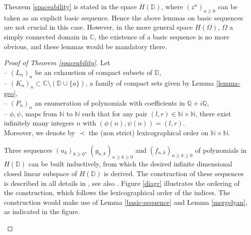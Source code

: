 \documentclass[12pt]{amsart}
\numberwithin{equation}{section}
\begin{document}
Theorem \ref{spaceability} is stated in the space $H({\mathbb D})$, where $(z^{n})_{n\geq 0}$ can be taken as an explicit basic sequence. Hence the above lemmas on basic sequences are not crucial in this case. However, in the more general space $H(\Omega)$, $\Omega$ a simply connected domain in ${\mathbb{C}}$, the existence of a basic sequence is no more obvious, and these lemmas would be mandatory there.
\begin{proof}[Proof of Theorem \ref{spaceability}]Let \\
-- $\left(L_n\right)_n$ be an exhaustion of compact subsets of ${\mathbb D}$,\\
-- $\left(K_n\right)_n \subset {\mathbb{C}} \setminus ({\mathbb D} \cup \{a\})$, a family of compact sets given by Lemma \ref{lemma-geo},\\
-- $\left(P_n\right)_n$ an enumeration of polynomials with coefficients in ${\mathbb{Q}}+i{\mathbb{Q}}$,\\
-- $\phi,\psi$, maps from ${\mathbb{N}}$ to ${\mathbb{N}}$ such that for any pair $(l,r)\in {\mathbb{N}}\times {\mathbb{N}}$, there exist infinitely many integers $n$ with $(\phi(n),\psi(n))=(l,r)$. \\
Moreover, we denote by $\prec$ the (non strict) lexicographical order on ${\mathbb{N}}\times {\mathbb{N}}$.

Three sequences $\left(u_{k}\right)_{k\geq 0}$, $\left(g_{n,k}\right)_{n\geq k\geq 0}$ and $\left(f_{n,k}\right)_{n\geq k\geq 0}$ of polynomials in $H({\mathbb D})$ can be built inductively, from which the desired infinite dimensional closed linear subspace of $H({\mathbb D})$ is derived. The construction of these sequences is described in all details in \cite{Men}, see also \cite{CH}. Figure \ref{diagr} illustrates the ordering of the construction, which follows the lexicographical order of the indices. The construction 
would make use of Lemma \ref{basic-sequence} and Lemma \ref{mergelyan}, as indicated in the figure.
\begin{figure}[htb]
\centering
{}
\end{figure}
\end{proof}
\end{document}
